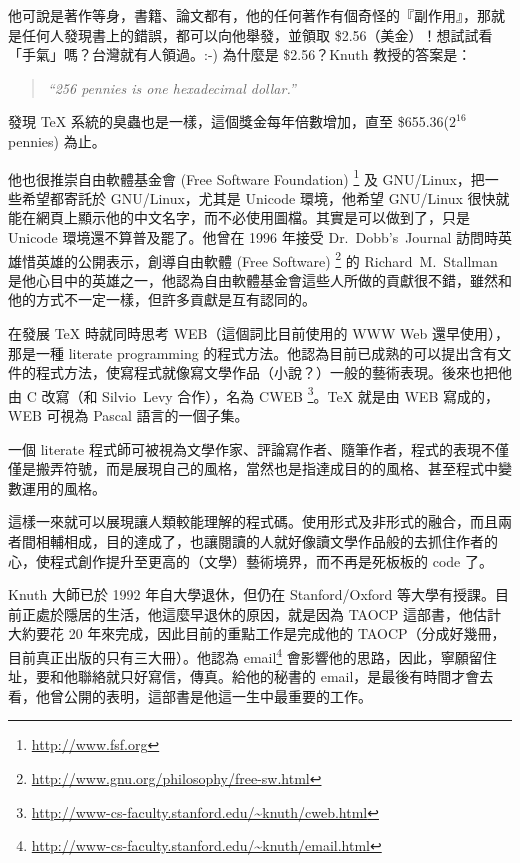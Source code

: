 他可說是著作等身，書籍、論文都有，他的任何著作有個奇怪的『副作用』，那就是任何人發現書上的錯誤，都可以向他舉發，並領取 \$2.56（美金）！想試試看「手氣」嗎？台灣就有人領過。:-) 為什麼是 \$2.56？Knuth 教授的答案是：

\begin{quote}
\itshape
``256 pennies is one hexadecimal dollar.''
\end{quote}

發現 \TeX{} 系統的臭蟲也是一樣，這個獎金每年倍數增加，直至 \$655.36($2^{16}$ pennies) 為止。

他也很推崇自由軟體基金會 (Free Software Foundation)%
\footnote{\url{http://www.fsf.org}}
及 GNU/Linux，把一些希望都寄託於 GNU/Linux，尤其是 Unicode 環境，他希望 GNU/Linux 很快就能在網頁上顯示他的中文名字，而不必使用圖檔。其實是可以做到了，只是 Unicode 環境還不算普及罷了。他曾在 1996 年接受 Dr.~Dobb's~Journal 訪問時英雄惜英雄的公開表示，創導自由軟體 (Free Software)%
\footnote{\url{http://www.gnu.org/philosophy/free-sw.html}}
的 Richard~M.~Stallman 是他心目中的英雄之一，他認為自由軟體基金會這些人所做的貢獻很不錯，雖然和他的方式不一定一樣，但許多貢獻是互有認同的。

在發展 \TeX{} 時就同時思考 WEB（這個詞比目前使用的 WWW Web 還早使用），那是一種 literate programming 的程式方法。他認為目前已成熟的可以提出含有文件的程式方法，使寫程式就像寫文學作品（小說？）一般的藝術表現。後來也把他由 C 改寫（和 Silvio~Levy 合作），名為 CWEB%
\footnote{\url{http://www-cs-faculty.stanford.edu/~knuth/cweb.html}}。\TeX{} 就是由 WEB 寫成的，WEB 可視為 Pascal 語言的一個子集。

一個 literate 程式師可被視為文學作家、評論寫作者、隨筆作者\chdots{}，程式的表現不僅僅是搬弄符號，而是展現自己的風格，當然也是指達成目的的風格、甚至程式中變數運用的風格。

這樣一來就可以展現讓人類較能理解的程式碼。使用形式及非形式的融合，而且兩者間相輔相成，目的達成了，也讓閱讀的人就好像讀文學作品般的去抓住作者的心，使程式創作提升至更高的（文學）藝術境界，而不再是死板板的 code 了。

Knuth 大師已於 1992 年自大學退休，但仍在 Stanford/Oxford 等大學有授課。目前正處於隱居的生活，他這麼早退休的原因，就是因為 TAOCP 這部書，他估計大約要花 20 年來完成，因此目前的重點工作是完成他的 TAOCP（分成好幾冊，目前真正出版的只有三大冊）。他認為
email\footnote{\url{http://www-cs-faculty.stanford.edu/~knuth/email.html}}
會影響他的思路，因此，寧願留住址，要和他聯絡就只好寫信，傳真。給他的秘書的 email，是最後有時間才會去看，他曾公開的表明，這部書是他這一生中最重要的工作。

